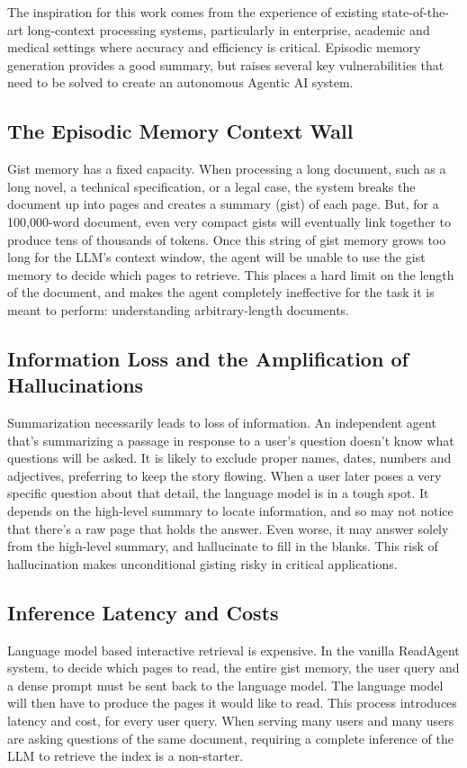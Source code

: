\documentclass[conference]{IEEEtran}
\begin{document}
The inspiration for this work comes from the experience of existing state-of-the-art long-context processing systems, particularly in enterprise, academic and medical settings where accuracy and efficiency is critical. Episodic memory generation provides a good summary, but raises several key vulnerabilities that need to be solved to create an autonomous Agentic AI system.

\subsection{The Episodic Memory Context Wall}
Gist memory has a fixed capacity. When processing a long document, such as a long novel, a technical specification, or a legal case, the system breaks the document up into pages and creates a summary (gist) of each page. But, for a 100,000-word document, even very compact gists will eventually link together to produce tens of thousands of tokens. Once this string of gist memory grows too long for the LLM's context window, the agent will be unable to use the gist memory to decide which pages to retrieve. This places a hard limit on the length of the document, and makes the agent completely ineffective for the task it is meant to perform: understanding arbitrary-length documents.

\subsection{Information Loss and the Amplification of Hallucinations}
Summarization necessarily leads to loss of information. An independent agent that's summarizing a passage in response to a user's question doesn't know what questions will be asked. It is likely to exclude proper names, dates, numbers and adjectives, preferring to keep the story flowing. When a user later poses a very specific question about that detail, the language model is in a tough spot. It depends on the high-level summary to locate information, and so may not notice that there's a raw page that holds the answer. Even worse, it may answer solely from the high-level summary, and hallucinate to fill in the blanks. This risk of hallucination makes unconditional gisting risky in critical applications.

\subsection{Inference Latency and Costs}
Language model based interactive retrieval is expensive. In the vanilla ReadAgent system, to decide which pages to read, the entire gist memory, the user query and a dense prompt must be sent back to the language model. The language model will then have to produce the pages it would like to read. This process introduces latency and cost, for every user query. When serving many users and many users are asking questions of the same document, requiring a complete inference of the LLM to retrieve the index is a non-starter. 
\end{document}
